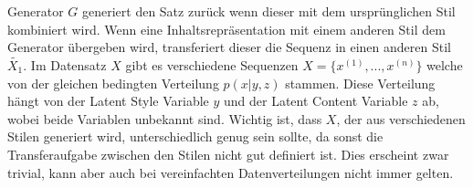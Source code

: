 Generator $G$ generiert den Satz zurück wenn dieser mit dem ursprünglichen Stil kombiniert wird. Wenn eine
Inhaltsrepräsentation mit einem anderen Stil dem Generator übergeben wird, transferiert dieser die Sequenz in einen
anderen Stil $\tilde{X_1}$. 
\newline
\newline
Im Datensatz $X$ gibt es verschiedene Sequenzen $X = \{x^{(1)},..., x^{(n)} \}$ welche von der gleichen bedingten Verteilung
$p(x|y,z)$ stammen. Diese Verteilung hängt von der Latent Style Variable $y$ und der Latent Content Variable $z$ ab,
wobei beide Variablen unbekannt sind. Wichtig ist, dass $X$, der aus verschiedenen Stilen generiert
wird, unterschiedlich genug sein sollte, da sonst die Transferaufgabe zwischen den Stilen nicht gut definiert ist. Dies
erscheint zwar trivial, kann aber auch bei vereinfachten Datenverteilungen nicht immer gelten.

